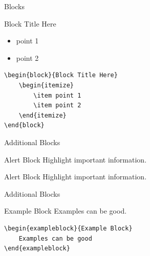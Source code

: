 \documentclass[newPxFont]{beamer}
\begin{document}

\begin{frame}[containsverbatim]{Blocks}

\begin{block}{Block Title Here}
	\begin{itemize}
		\item point 1
		\item point 2
	\end{itemize}
\end{block}
\begin{verbatim}
\begin{block}{Block Title Here}
    \begin{itemize}
        \item point 1
        \item point 2
    \end{itemize}
\end{block}
\end{verbatim}
\end{frame}


\begin{frame}[containsverbatim]{Additional Blocks}
\begin{alertblock}{Alert Block}
	Highlight important information.
\end{alertblock}

\begin{sthlmLatex}
\begin{alertblock}{Alert Block}
Highlight important information.
\end{alertblock}
\end{sthlmLatex}


\end{frame}


\begin{frame}[containsverbatim]{Additional Blocks}

\begin{exampleblock}{Example Block}
	Examples can be good.
\end{exampleblock}
\begin{verbatim}
\begin{exampleblock}{Example Block}
    Examples can be good
\end{exampleblock}
\end{verbatim}
\end{frame}
\end{document}
